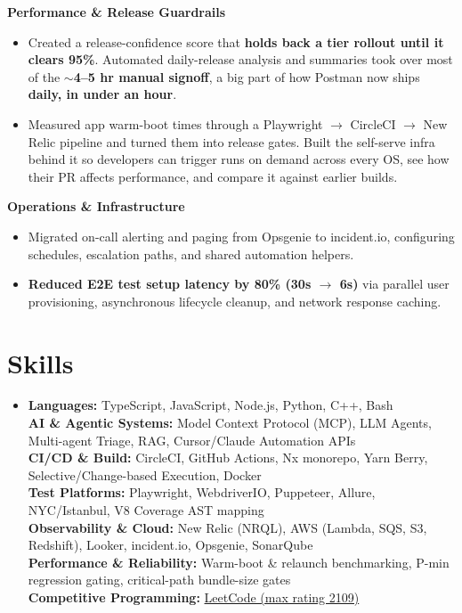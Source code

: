 \documentclass[9.5pt,a4paper]{article}
\newcommand{\resumeItem}[1]{
  \item\small{{#1}}
}
\begin{document}
  \vspace{1.5pt}
  \textbf{\small\color{darkink} Performance \& Release Guardrails}
  \begin{itemize}[leftmargin=12pt, topsep=1pt, itemsep=1.5pt, parsep=0pt]
    \resumeItem{Created a release-confidence score that \textbf{holds back a tier rollout until it clears 95\%}. Automated daily-release analysis and summaries took over most of the \textbf{$\sim$4--5 hr manual signoff}, a big part of how Postman now ships \textbf{daily, in under an hour}.}
    \resumeItem{Measured app warm-boot times through a Playwright $\rightarrow$ CircleCI $\rightarrow$ New Relic pipeline and turned them into release gates. Built the self-serve infra behind it so developers can trigger runs on demand across every OS, see how their PR affects performance, and compare it against earlier builds.}
  \end{itemize}

  \vspace{1.5pt}
  \textbf{\small\color{darkink} Operations \& Infrastructure}
  \begin{itemize}[leftmargin=12pt, topsep=1pt, itemsep=1.5pt, parsep=0pt]
    \resumeItem{Migrated on-call alerting and paging from Opsgenie to incident.io, configuring schedules, escalation paths, and shared automation helpers.}
    \resumeItem{\textbf{Reduced E2E test setup latency by 80\% (30s $\rightarrow$ 6s)} via parallel user provisioning, asynchronous lifecycle cleanup, and network response caching.}
  \end{itemize}
\vspace{-4pt}

\section{Skills}
\vspace{1pt}
\begin{itemize}[leftmargin=0in, label={}, topsep=1pt, itemsep=1pt, parsep=0pt]
    \item \small{
     \textbf{Languages:} {TypeScript, JavaScript, Node.js, Python, C++, Bash} \\
     \textbf{AI \& Agentic Systems:} {Model Context Protocol (MCP), LLM Agents, Multi-agent Triage, RAG, Cursor/Claude Automation APIs} \\
     \textbf{CI/CD \& Build:} {CircleCI, GitHub Actions, Nx monorepo, Yarn Berry, Selective/Change-based Execution, Docker} \\
     \textbf{Test Platforms:} {Playwright, WebdriverIO, Puppeteer, Allure, NYC/Istanbul, V8 Coverage AST mapping} \\
     \textbf{Observability \& Cloud:} {New Relic (NRQL), AWS (Lambda, SQS, S3, Redshift), Looker, incident.io, Opsgenie, SonarQube} \\
     \textbf{Performance \& Reliability:} {Warm-boot \& relaunch benchmarking, P-min regression gating, critical-path bundle-size gates} \\
     \textbf{Competitive Programming:} {\href{https://leetcode.com/u/aviralgupta752/}{LeetCode (max rating 2109)}}
    }
\end{itemize}
\vspace{-6pt}
\end{document}
